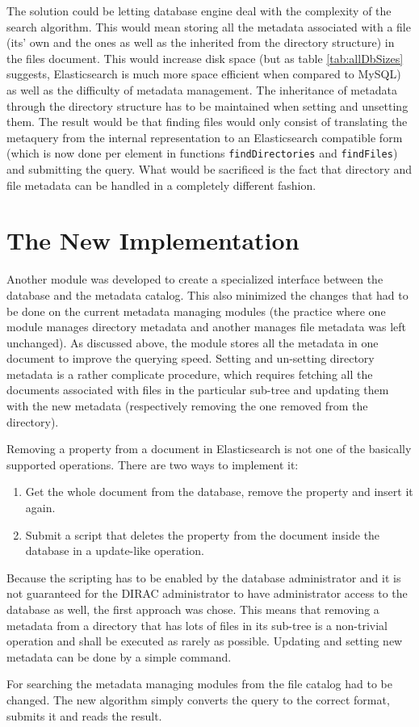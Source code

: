 The solution could be letting database engine deal 
with the complexity of the search algorithm. This would mean storing all the metadata associated with a file (its' 
own and the ones as well as the inherited from the directory structure) in the files document. This would increase
disk space (but as table \ref{tab:allDbSizes} suggests, Elasticsearch is much more space efficient when compared 
to MySQL) as well as the difficulty of metadata management. The inheritance of metadata through the directory 
structure has to be maintained when setting and unsetting them. The result would be that finding files would 
only consist of translating the metaquery from the internal representation to an Elasticsearch compatible form 
(which is now done per element in functions \texttt{findDirectories} and \texttt{findFiles}) and submitting the
query. What would be sacrificed is the fact that directory and file metadata can be handled in a completely 
different fashion.

\section{The New Implementation}

Another module was developed to create a specialized interface between the database and the metadata catalog. This 
also minimized the changes that had to be done on the current metadata managing modules (the practice where one
module manages directory metadata and another manages file metadata was left unchanged). As discussed above, the 
module stores all the metadata in one document to improve the querying speed. Setting and un-setting directory 
metadata is a rather complicate procedure, which requires fetching all the documents associated with files in
the particular sub-tree and updating them with the new metadata (respectively removing the one removed from the 
directory). 

Removing a property from a document in Elasticsearch is not one of the basically supported operations. There are 
two ways to implement it: 
\begin{enumerate}
\item Get the whole document from the database, remove the property and insert it again.
\item Submit a script that deletes the property from the document inside the database in a update-like operation.
\end{enumerate}
Because the scripting has to be enabled by the database administrator and it is not guaranteed for the DIRAC 
administrator to have administrator access to the database as well, the first approach was chose. This means that
removing a metadata from a directory that has lots of files in its sub-tree is a non-trivial operation and shall
be executed as rarely as possible. Updating and setting new metadata can be done by a simple command.

For searching the metadata managing modules from the file catalog had to be changed. The new algorithm simply 
converts the query to the correct format, submits it and reads the result. 
